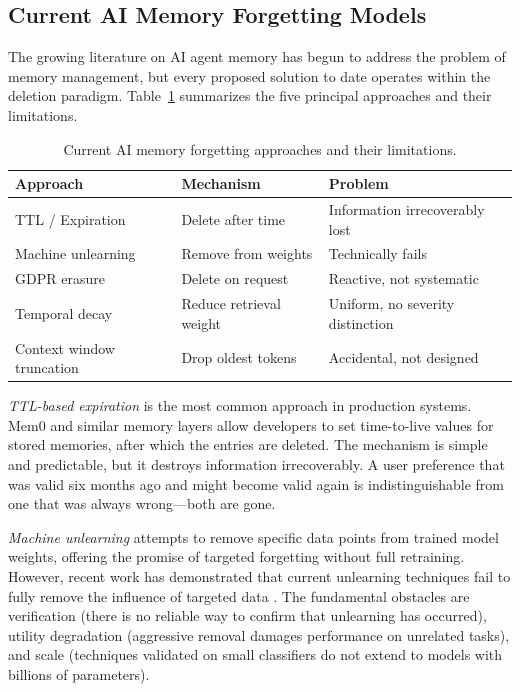 \documentclass[12pt]{article}
\begin{document}
\subsection{Current AI Memory Forgetting Models}
\label{sec:current-models}

The growing literature on AI agent memory has begun to address the problem of memory management, but every proposed solution to date operates within the deletion paradigm. Table~\ref{tab:current-models} summarizes the five principal approaches and their limitations.

\begin{table}[ht]
\centering
\caption{Current AI memory forgetting approaches and their limitations.}
\label{tab:current-models}
\begin{tabular}{@{}lll@{}}
\toprule
Approach & Mechanism & Problem \\
\midrule
TTL / Expiration & Delete after time & Information irrecoverably lost \\
Machine unlearning & Remove from weights & Technically fails \citep{unlearning-iclr2025} \\
GDPR erasure & Delete on request & Reactive, not systematic \\
Temporal decay & Reduce retrieval weight & Uniform, no severity distinction \\
Context window truncation & Drop oldest tokens & Accidental, not designed \\
\bottomrule
\end{tabular}
\end{table}

\emph{TTL-based expiration} is the most common approach in production systems. Mem0 \citep{mem0-2025} and similar memory layers allow developers to set time-to-live values for stored memories, after which the entries are deleted. The mechanism is simple and predictable, but it destroys information irrecoverably. A user preference that was valid six months ago and might become valid again is indistinguishable from one that was always wrong---both are gone.

\emph{Machine unlearning} attempts to remove specific data points from trained model weights, offering the promise of targeted forgetting without full retraining. However, recent work has demonstrated that current unlearning techniques fail to fully remove the influence of targeted data \citep{unlearning-iclr2025}. The fundamental obstacles are verification (there is no reliable way to confirm that unlearning has occurred), utility degradation (aggressive removal damages performance on unrelated tasks), and scale (techniques validated on small classifiers do not extend to models with billions of parameters).
\end{document}
